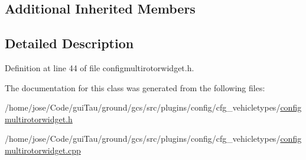 \subsection*{Additional Inherited Members}


\subsection{Detailed Description}


Definition at line 44 of file configmultirotorwidget.\-h.



The documentation for this class was generated from the following files\-:\begin{DoxyCompactItemize}
\item 
/home/jose/\-Code/gui\-Tau/ground/gcs/src/plugins/config/cfg\-\_\-vehicletypes/\hyperlink{configmultirotorwidget_8h}{configmultirotorwidget.\-h}\item 
/home/jose/\-Code/gui\-Tau/ground/gcs/src/plugins/config/cfg\-\_\-vehicletypes/\hyperlink{configmultirotorwidget_8cpp}{configmultirotorwidget.\-cpp}\end{DoxyCompactItemize}
